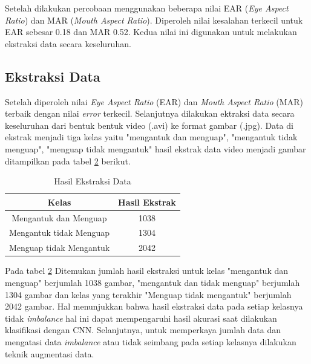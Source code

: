 \begin{table}[H]
    Setelah dilakukan percobaan menggunakan beberapa nilai EAR (\textit{Eye Aspect Ratio}) dan MAR (\textit{Mouth Aspect Ratio}). Diperoleh nilai kesalahan terkecil untuk EAR sebesar 0.18 dan MAR 0.52. Kedua nilai ini digunakan untuk melakukan ekstraksi data secara keseluruhan.
    
\subsection{Ekstraksi Data}

     Setelah diperoleh nilai \textit{Eye Aspect Ratio }(EAR) dan \textit{Mouth Aspect Ratio} (MAR) terbaik dengan nilai \textit{error} terkecil. Selanjutnya dilakukan ektraksi data secara keseluruhan dari bentuk bentuk video (.avi) ke format gambar (.jpg). Data di ekstrak menjadi tiga kelas yaitu "mengantuk dan menguap", "mengantuk tidak menguap", "menguap tidak mengantuk" hasil ekstrak data video menjadi gambar ditampilkan pada tabel \ref{Hasil Ekstraksi Data} berikut. 

       \begin{table}[H]
            \centering
            \caption{Hasil Ekstraksi Data}
            \begin{tabular}{cc}
                \toprule
                \textbf{Kelas} & \textbf{Hasil Ekstrak} \\
                \midrule  
                           Mengantuk dan Menguap & 1038  \\
                          Mengantuk tidak Menguap & 1304 \\
                           Menguap tidak Mengantuk& 2042  \\
                
                    \bottomrule
                \end{tabular}
                \label{Hasil Ekstraksi Data}
            \end{table}

        Pada tabel \ref{Hasil Ekstraksi Data} Ditemukan jumlah hasil ekstraksi untuk kelas "mengantuk dan menguap" berjumlah 1038 gambar, "mengantuk dan tidak menguap" berjumlah 1304 gambar dan kelas yang terakhir "Menguap tidak mengantuk" berjumlah 2042 gambar. Hal menunjukkan bahwa hasil ekstraksi data pada setiap kelasnya tidak \textit{imbalance} hal ini dapat mempengaruhi hasil akurasi saat dilakukan klasifikasi dengan CNN. Selanjutnya, untuk memperkaya jumlah data dan mengatasi data \textit{imbalance} atau tidak seimbang pada setiap kelasnya dilakukan teknik augmentasi data. 
        

\end{table}
